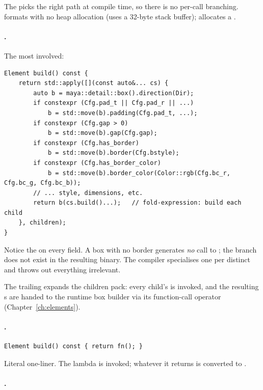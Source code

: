 The  picks the right path at compile time, so
there is no per-call branching.  formats with no
heap allocation (uses a 32-byte stack buffer); 
allocates a .

\paragraph{.} The most
involved:

\begin{lstlisting}
Element build() const {
    return std::apply([](const auto&... cs) {
        auto b = maya::detail::box().direction(Dir);
        if constexpr (Cfg.pad_t || Cfg.pad_r || ...)
            b = std::move(b).padding(Cfg.pad_t, ...);
        if constexpr (Cfg.gap > 0)
            b = std::move(b).gap(Cfg.gap);
        if constexpr (Cfg.has_border)
            b = std::move(b).border(Cfg.bstyle);
        if constexpr (Cfg.has_border_color)
            b = std::move(b).border_color(Color::rgb(Cfg.bc_r, Cfg.bc_g, Cfg.bc_b));
        // ... style, dimensions, etc.
        return b(cs.build()...);   // fold-expression: build each child
    }, children);
}
\end{lstlisting}

Notice the  on every  field. A box
with no border generates \emph{no} call to ; the
branch does not exist in the resulting binary. The compiler
specialises one  per distinct  and
throws out everything irrelevant.

The trailing  expands the children pack:
every child's  is invoked, and the resulting
s are handed to the runtime box builder via its
function-call operator (Chapter~\ref{ch:elements}).

\paragraph{.}

\begin{lstlisting}
Element build() const { return fn(); }
\end{lstlisting}

Literal one-liner. The lambda is invoked; whatever it returns is
converted to .

\paragraph{.}

